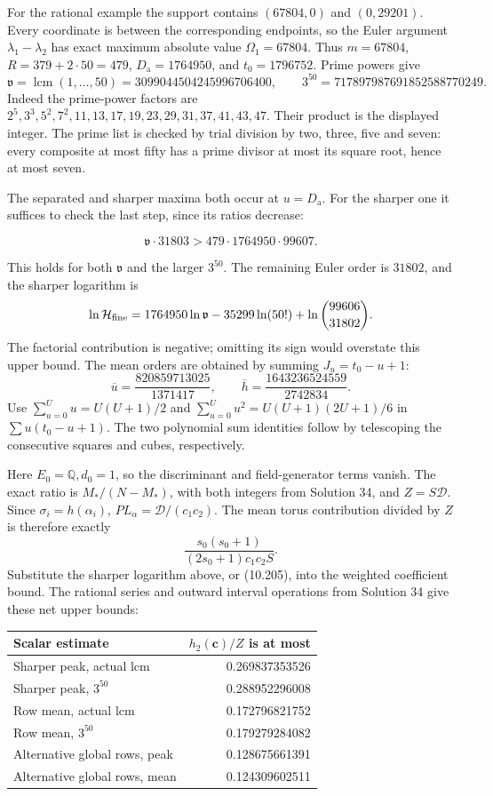 \documentclass[
  11pt,
  a4paper,
]{article}
\newcounter{none} %
\begin{document}
For the rational example the support contains \((67804,0)\) and
\((0,29201)\). Every coordinate is between the corresponding endpoints,
so the Euler argument \(\lambda_1-\lambda_2\) has exact maximum absolute
value \(\Omega_1=67804\). Thus \(m=67804\), \(R=379+2\cdot50=479\),
\(D_{\mathrm a}=1764950\), and \(t_0=1796752\). Prime powers give \[
\mathfrak v=\operatorname{lcm}(1,\ldots,50)
=3099044504245996706400,\qquad
3^{50}=717897987691852588770249.
\] Indeed the prime-power factors are
\(2^5,3^3,5^2,7^2,11,13,17,19,23,29,31,37,41,43,47\). Their product is
the displayed integer. The prime list is checked by trial division by
two, three, five and seven: every composite at most fifty has a prime
divisor at most its square root, hence at most seven.

The separated and sharper maxima both occur at \(u=D_{\mathrm a}\). For
the sharper one it suffices to check the last step, since its ratios
decrease:

\[
\mathfrak v\cdot31803
>479\cdot1764950\cdot99607.
\]

This holds for both \(\mathfrak v\) and the larger \(3^{50}\). The
remaining Euler order is \(31802\), and the sharper logarithm is \[
\ln\mathcal H_{\rm fine}
=1764950\ln\mathfrak v-35299\ln(50!)
+\ln\binom{99606}{31802}.
\] The factorial contribution is negative; omitting its sign would
overstate this upper bound. The mean orders are obtained by summing
\(J_u=t_0-u+1\): \[
\overline u=\frac{820859713025}{1371417},
\qquad
\overline h=\frac{1643236524559}{2742834}.
\] Use \(\sum_{u=0}^Uu=U(U+1)/2\) and \(\sum_{u=0}^Uu^2=U(U+1)(2U+1)/6\)
in \(\sum u(t_0-u+1)\). The two polynomial sum identities follow by
telescoping the consecutive squares and cubes, respectively.

Here \(E_0=\mathbb Q,d_0=1\), so the discriminant and field-generator
terms vanish. The exact ratio is \(M_*/(N-M_*)\), with both integers
from Solution 34, and \(Z=S\mathcal D\). Since \(\sigma_i=h(\alpha_i)\),
\(PL_\alpha=\mathcal D/(c_1c_2)\). The mean torus contribution divided
by \(Z\) is therefore exactly \[
\frac{s_0(s_0+1)}{(2s_0+1)c_1c_2S}.
\] Substitute the sharper logarithm above, or (10.205), into the
weighted coefficient bound. The rational series and outward interval
operations from Solution 34 give these net upper bounds:

{\def\LTcaptype{none} %
\begin{longtable}[]{@{}lr@{}}
\toprule\noalign{}
Scalar estimate & \(h_2(\boldsymbol c)/Z\) is at most \\
\midrule\noalign{}
\endhead
\bottomrule\noalign{}
\endlastfoot
Sharper peak, actual lcm & 0.269837353526 \\
Sharper peak, \(3^{50}\) & 0.288952296008 \\
Row mean, actual lcm & 0.172796821752 \\
Row mean, \(3^{50}\) & 0.179279284082 \\
Alternative global rows, peak & 0.128675661391 \\
Alternative global rows, mean & 0.124309602511 \\
\end{longtable}
}
\end{document}
